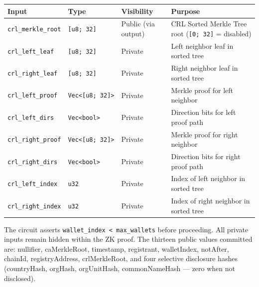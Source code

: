\documentclass[11pt, a4paper]{article}
\begin{document}
\begin{longtable}[]{@{}
  >{\raggedright\arraybackslash}p{}
  >{\raggedright\arraybackslash}p{}
  >{\raggedright\arraybackslash}p{}
  >{\raggedright\arraybackslash}p{}@{}}
\toprule\noalign{}
\begin{minipage}[b]{\linewidth}\raggedright
Input
\end{minipage} & \begin{minipage}[b]{\linewidth}\raggedright
Type
\end{minipage} & \begin{minipage}[b]{\linewidth}\raggedright
Visibility
\end{minipage} & \begin{minipage}[b]{\linewidth}\raggedright
Purpose
\end{minipage} \\
\midrule\noalign{}
\endhead
\bottomrule\noalign{}
\endlastfoot
\texttt{crl\_merkle\_root} & \texttt{{[}u8;\ 32{]}} & Public (via
output) & CRL Sorted Merkle Tree root (\texttt{{[}0;\ 32{]}} =
disabled) \\
\texttt{crl\_left\_leaf} & \texttt{{[}u8;\ 32{]}} & Private & Left
neighbor leaf in sorted tree \\
\texttt{crl\_right\_leaf} & \texttt{{[}u8;\ 32{]}} & Private & Right
neighbor leaf in sorted tree \\
\texttt{crl\_left\_proof} &
\texttt{Vec\textless{}{[}u8;\ 32{]}\textgreater{}} & Private & Merkle
proof for left neighbor \\
\texttt{crl\_left\_dirs} & \texttt{Vec\textless{}bool\textgreater{}} &
Private & Direction bits for left proof path \\
\texttt{crl\_right\_proof} &
\texttt{Vec\textless{}{[}u8;\ 32{]}\textgreater{}} & Private & Merkle
proof for right neighbor \\
\texttt{crl\_right\_dirs} & \texttt{Vec\textless{}bool\textgreater{}} &
Private & Direction bits for right proof path \\
\texttt{crl\_left\_index} & \texttt{u32} & Private & Index of left
neighbor in sorted tree \\
\texttt{crl\_right\_index} & \texttt{u32} & Private & Index of right
neighbor in sorted tree \\
\end{longtable}

The circuit asserts \texttt{wallet\_index\ \textless{}\ max\_wallets}
before proceeding. All private inputs remain hidden within the ZK proof.
The thirteen public values committed are: nullifier, caMerkleRoot,
timestamp, registrant, walletIndex, notAfter, chainId, registryAddress,
crlMerkleRoot, and four selective disclosure hashes (countryHash,
orgHash, orgUnitHash, commonNameHash --- zero when not disclosed).
\end{document}
